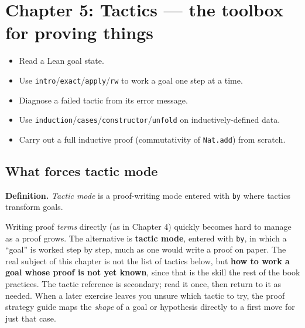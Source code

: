 \chapter{Chapter 5: Tactics --- the toolbox for proving things}\label{sec:05-tactics:00-index:1}

\begin{learningobjectives}
\begin{itemize}
\tightlist
\item
  Read a Lean goal state.
\item
  Use \texttt{intro}/\texttt{exact}/\texttt{apply}/\texttt{rw} to work a goal one step at a time.
\item
  Diagnose a failed tactic from its error message.
\item
  Use \texttt{induction}/\texttt{cases}/\texttt{constructor}/\texttt{unfold} on inductively-defined data.
\item
  Carry out a full inductive proof (commutativity of \texttt{Nat.add}) from scratch.
\end{itemize}
\end{learningobjectives}


\section*{What forces tactic mode}\label{sec:05-tactics:00-index:2}

\textbf{Definition.} \emph{Tactic mode} is a proof-writing mode entered with \texttt{by} where tactics transform goals.

Writing proof \emph{terms} directly (as in Chapter 4) quickly becomes hard to manage as a proof grows. The alternative is \textbf{tactic mode}, entered with \texttt{by}, in which a ``goal'' is worked step by step, much as one would write a proof on paper. The real subject of this chapter is not the list of tactics below, but \textbf{how to work a goal whose proof is not yet known}, since that is the skill the rest of the book practices. The tactic reference is secondary; read it once, then return to it as needed. When a later exercise leaves you unsure which tactic to try, the proof strategy guide maps the \emph{shape} of a goal or hypothesis directly to a first move for just that case.

